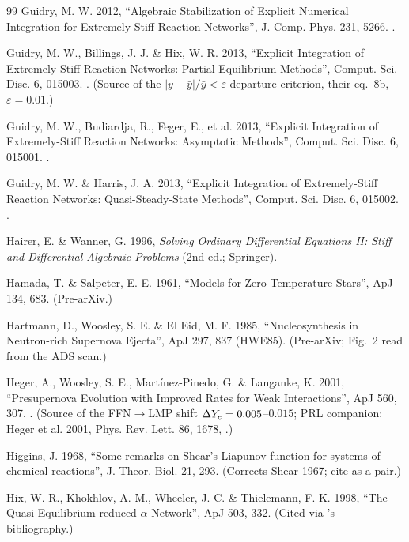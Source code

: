 \begin{thebibliography}{99}
Guidry, M. W. 2012, ``Algebraic Stabilization of Explicit Numerical Integration
for Extremely Stiff Reaction Networks'', J. Comp. Phys. 231, 5266.
.

Guidry, M. W., Billings, J. J. \& Hix, W. R. 2013, ``Explicit Integration of
Extremely-Stiff Reaction Networks: Partial Equilibrium Methods'', Comput. Sci.
Disc. 6, 015003. . (Source of the $|y - \bar y|/\bar y <
\varepsilon$ departure criterion, their eq.~8b, $\varepsilon = 0.01$.)

Guidry, M. W., Budiardja, R., Feger, E., et al. 2013, ``Explicit Integration of
Extremely-Stiff Reaction Networks: Asymptotic Methods'', Comput. Sci. Disc. 6,
015001. .

Guidry, M. W. \& Harris, J. A. 2013, ``Explicit Integration of Extremely-Stiff
Reaction Networks: Quasi-Steady-State Methods'', Comput. Sci. Disc. 6, 015002.
.

Hairer, E. \& Wanner, G. 1996, \emph{Solving Ordinary Differential Equations
II: Stiff and Differential-Algebraic Problems} (2nd ed.; Springer).

Hamada, T. \& Salpeter, E. E. 1961, ``Models for Zero-Temperature Stars'',
ApJ 134, 683. (Pre-arXiv.)

Hartmann, D., Woosley, S. E. \& El Eid, M. F. 1985, ``Nucleosynthesis in
Neutron-rich Supernova Ejecta'', ApJ 297, 837 (HWE85). (Pre-arXiv; Fig.~2 read
from the ADS scan.)

Heger, A., Woosley, S. E., Mart\'inez-Pinedo, G. \& Langanke, K. 2001,
``Presupernova Evolution with Improved Rates for Weak Interactions'', ApJ 560,
307. . (Source of the FFN$\to$LMP shift $\Delta Y_{e} = 0.005$--$0.015$;
PRL companion: Heger et al. 2001, Phys. Rev. Lett. 86, 1678,
.)

Higgins, J. 1968, ``Some remarks on Shear's Liapunov function for systems of
chemical reactions'', J. Theor. Biol. 21, 293. (Corrects Shear 1967; cite as a
pair.)

Hix, W. R., Khokhlov, A. M., Wheeler, J. C. \& Thielemann, F.-K. 1998, ``The
Quasi-Equilibrium-reduced $\alpha$-Network'', ApJ 503, 332. (Cited via
\citealp{ht1999b}'s bibliography.)


\end{thebibliography}

